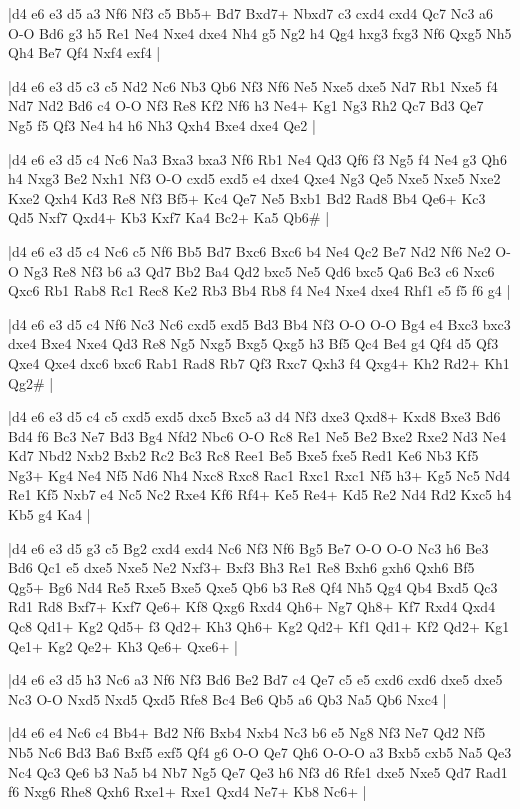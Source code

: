 \whitename{}
\blackname{}
\makegametitle
|d4 e6 e3 d5 a3 Nf6 Nf3 c5 Bb5+ Bd7 Bxd7+ Nbxd7 c3 cxd4 cxd4 Qc7 Nc3 a6 O-O Bd6 g3 h5 Re1 Ne4 Nxe4 dxe4 Nh4 g5 Ng2 h4 Qg4 hxg3 fxg3 Nf6 Qxg5 Nh5 Qh4 Be7 Qf4 Nxf4 exf4  |

\whitename{}
\blackname{}
\makegametitle
|d4 e6 e3 d5 c3 c5 Nd2 Nc6 Nb3 Qb6 Nf3 Nf6 Ne5 Nxe5 dxe5 Nd7 Rb1 Nxe5 f4 Nd7 Nd2 Bd6 c4 O-O Nf3 Re8 Kf2 Nf6 h3 Ne4+ Kg1 Ng3 Rh2 Qc7 Bd3 Qe7 Ng5 f5 Qf3 Ne4 h4 h6 Nh3 Qxh4 Bxe4 dxe4 Qe2  |

\whitename{}
\blackname{}
\makegametitle
|d4 e6 e3 d5 c4 Nc6 Na3 Bxa3 bxa3 Nf6 Rb1 Ne4 Qd3 Qf6 f3 Ng5 f4 Ne4 g3 Qh6 h4 Nxg3 Be2 Nxh1 Nf3 O-O cxd5 exd5 e4 dxe4 Qxe4 Ng3 Qe5 Nxe5 Nxe5 Nxe2 Kxe2 Qxh4 Kd3 Re8 Nf3 Bf5+ Kc4 Qe7 Ne5 Bxb1 Bd2 Rad8 Bb4 Qe6+ Kc3 Qd5 Nxf7 Qxd4+ Kb3 Kxf7 Ka4 Bc2+ Ka5 Qb6\#  |

\whitename{}
\blackname{}
\makegametitle
|d4 e6 e3 d5 c4 Nc6 c5 Nf6 Bb5 Bd7 Bxc6 Bxc6 b4 Ne4 Qc2 Be7 Nd2 Nf6 Ne2 O-O Ng3 Re8 Nf3 b6 a3 Qd7 Bb2 Ba4 Qd2 bxc5 Ne5 Qd6 bxc5 Qa6 Bc3 c6 Nxc6 Qxc6 Rb1 Rab8 Rc1 Rec8 Ke2 Rb3 Bb4 Rb8 f4 Ne4 Nxe4 dxe4 Rhf1 e5 f5 f6 g4  |

\whitename{}
\blackname{}
\makegametitle
|d4 e6 e3 d5 c4 Nf6 Nc3 Nc6 cxd5 exd5 Bd3 Bb4 Nf3 O-O O-O Bg4 e4 Bxc3 bxc3 dxe4 Bxe4 Nxe4 Qd3 Re8 Ng5 Nxg5 Bxg5 Qxg5 h3 Bf5 Qc4 Be4 g4 Qf4 d5 Qf3 Qxe4 Qxe4 dxc6 bxc6 Rab1 Rad8 Rb7 Qf3 Rxc7 Qxh3 f4 Qxg4+ Kh2 Rd2+ Kh1 Qg2\#  |

\whitename{}
\blackname{}
\makegametitle
|d4 e6 e3 d5 c4 c5 cxd5 exd5 dxc5 Bxc5 a3 d4 Nf3 dxe3 Qxd8+ Kxd8 Bxe3 Bd6 Bd4 f6 Bc3 Ne7 Bd3 Bg4 Nfd2 Nbc6 O-O Rc8 Re1 Ne5 Be2 Bxe2 Rxe2 Nd3 Ne4 Kd7 Nbd2 Nxb2 Bxb2 Rc2 Bc3 Rc8 Ree1 Be5 Bxe5 fxe5 Red1 Ke6 Nb3 Kf5 Ng3+ Kg4 Ne4 Nf5 Nd6 Nh4 Nxc8 Rxc8 Rac1 Rxc1 Rxc1 Nf5 h3+ Kg5 Nc5 Nd4 Re1 Kf5 Nxb7 e4 Nc5 Nc2 Rxe4 Kf6 Rf4+ Ke5 Re4+ Kd5 Re2 Nd4 Rd2 Kxc5 h4 Kb5 g4 Ka4  |

\whitename{}
\blackname{}
\makegametitle
|d4 e6 e3 d5 g3 c5 Bg2 cxd4 exd4 Nc6 Nf3 Nf6 Bg5 Be7 O-O O-O Nc3 h6 Be3 Bd6 Qc1 e5 dxe5 Nxe5 Ne2 Nxf3+ Bxf3 Bh3 Re1 Re8 Bxh6 gxh6 Qxh6 Bf5 Qg5+ Bg6 Nd4 Re5 Rxe5 Bxe5 Qxe5 Qb6 b3 Re8 Qf4 Nh5 Qg4 Qb4 Bxd5 Qc3 Rd1 Rd8 Bxf7+ Kxf7 Qe6+ Kf8 Qxg6 Rxd4 Qh6+ Ng7 Qh8+ Kf7 Rxd4 Qxd4 Qc8 Qd1+ Kg2 Qd5+ f3 Qd2+ Kh3 Qh6+ Kg2 Qd2+ Kf1 Qd1+ Kf2 Qd2+ Kg1 Qe1+ Kg2 Qe2+ Kh3 Qe6+ Qxe6+  |

\whitename{}
\blackname{}
\makegametitle
|d4 e6 e3 d5 h3 Nc6 a3 Nf6 Nf3 Bd6 Be2 Bd7 c4 Qe7 c5 e5 cxd6 cxd6 dxe5 dxe5 Nc3 O-O Nxd5 Nxd5 Qxd5 Rfe8 Bc4 Be6 Qb5 a6 Qb3 Na5 Qb6 Nxc4  |

\whitename{}
\blackname{}
\makegametitle
|d4 e6 e4 Nc6 c4 Bb4+ Bd2 Nf6 Bxb4 Nxb4 Nc3 b6 e5 Ng8 Nf3 Ne7 Qd2 Nf5 Nb5 Nc6 Bd3 Ba6 Bxf5 exf5 Qf4 g6 O-O Qe7 Qh6 O-O-O a3 Bxb5 cxb5 Na5 Qe3 Nc4 Qc3 Qe6 b3 Na5 b4 Nb7 Ng5 Qe7 Qe3 h6 Nf3 d6 Rfe1 dxe5 Nxe5 Qd7 Rad1 f6 Nxg6 Rhe8 Qxh6 Rxe1+ Rxe1 Qxd4 Ne7+ Kb8 Nc6+  |

